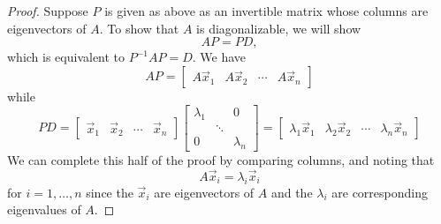 \documentclass{ximera}
\begin{document}
\begin{proof}
Suppose $P$ is given as above as an invertible matrix whose columns are eigenvectors of $A$. To show that $A$ is diagonalizable, we will show 
$$AP=PD,$$
which is equivalent to $P^{-1}AP=D$.  We have
$$AP=\begin{bmatrix}
A\vec{x}_1 & A\vec{x}_2 & \cdots & A\vec{x}_n
\end{bmatrix}$$
while
\begin{equation*}
PD=\begin{bmatrix}
\vec{x}_1 & \vec{x}_2 & \cdots & \vec{x}_n
\end{bmatrix} 
\begin{bmatrix}
\lambda _{1} &  & 0 \\
& \ddots &  \\
0 &  & \lambda _{n}
\end{bmatrix}=\begin{bmatrix}
\lambda _{1}\vec{x}_1 & \lambda _{2}\vec{x}_2 & \cdots & \lambda_{n}\vec{x}_n
\end{bmatrix}
\end{equation*}
We can complete this half of the proof by comparing columns, and noting that 
\begin{equation}
A \vec{x}_i = \lambda_i \vec{x}_i 
\end{equation}
for $i=1,\ldots,n$ since the $ \vec{x}_i$ are eigenvectors of $A$ and the $\lambda_i$ are corresponding eigenvalues of $A$.


\end{proof}
\end{document}
